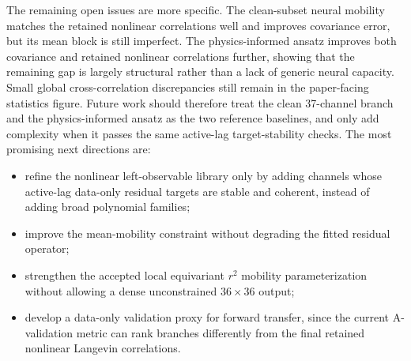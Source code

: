 \documentclass[11pt]{article}
\begin{document}
The remaining open issues are more specific.  The clean-subset neural mobility
matches the retained nonlinear correlations well and improves covariance error,
but its mean block is still imperfect.  The physics-informed ansatz improves
both covariance and retained nonlinear correlations further, showing that the
remaining gap is largely structural rather than a lack of generic neural
capacity.  Small global cross-correlation discrepancies still remain in the
paper-facing statistics figure.  Future work should therefore treat the clean
37-channel branch and the physics-informed ansatz as the two reference
baselines, and only add complexity when it passes the same active-lag
target-stability checks.  The most promising next directions are:
\begin{itemize}
  \item refine the nonlinear left-observable library only by adding channels
  whose active-lag data-only residual targets are stable and coherent, instead
  of adding broad polynomial families;
  \item improve the mean-mobility constraint without degrading the fitted
  residual operator;
  \item strengthen the accepted local equivariant \(r^2\) mobility
  parameterization without allowing a dense unconstrained \(36\times36\) output;
  \item develop a data-only validation proxy for forward transfer, since the
  current A-validation metric can rank branches differently from the final
  retained nonlinear Langevin correlations.
\end{itemize}
\end{document}

